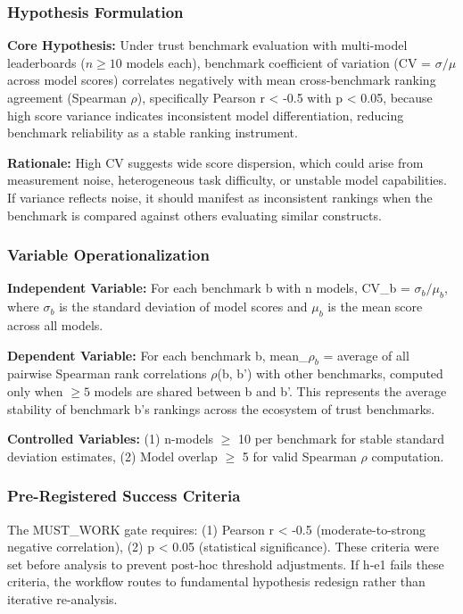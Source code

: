
\subsubsection{Hypothesis Formulation}

\textbf{Core Hypothesis:} Under trust benchmark evaluation with multi-model leaderboards ($n\geq 10$ models each), benchmark coefficient of variation (CV = $\sigma /\mu$ across model scores) correlates negatively with mean cross-benchmark ranking agreement (Spearman $\rho$), specifically Pearson r < -0.5 with p < 0.05, because high score variance indicates inconsistent model differentiation, reducing benchmark reliability as a stable ranking instrument.

\textbf{Rationale:} High CV suggests wide score dispersion, which could arise from measurement noise, heterogeneous task difficulty, or unstable model capabilities. If variance reflects noise, it should manifest as inconsistent rankings when the benchmark is compared against others evaluating similar constructs.

\subsubsection{Variable Operationalization}

\textbf{Independent Variable:} For each benchmark b with n models, CV\_b = $\sigma _b / \mu _b$, where $\sigma _b$ is the standard deviation of model scores and $\mu _b$ is the mean score across all models.

\textbf{Dependent Variable:} For each benchmark b, mean\_$\rho_{b}$ = average of all pairwise Spearman rank correlations $\rho$(b, b') with other benchmarks, computed only when $\geq 5$ models are shared between b and b'. This represents the average stability of benchmark b's rankings across the ecosystem of trust benchmarks.

\textbf{Controlled Variables:} (1) n-models $\geq$ 10 per benchmark for stable standard deviation estimates, (2) Model overlap $\geq$ 5 for valid Spearman $\rho$ computation.

\subsubsection{Pre-Registered Success Criteria}

The MUST\_WORK gate requires: (1) Pearson r < -0.5 (moderate-to-strong negative correlation), (2) p < 0.05 (statistical significance). These criteria were set before analysis to prevent post-hoc threshold adjustments. If h-e1 fails these criteria, the workflow routes to fundamental hypothesis redesign rather than iterative re-analysis.

